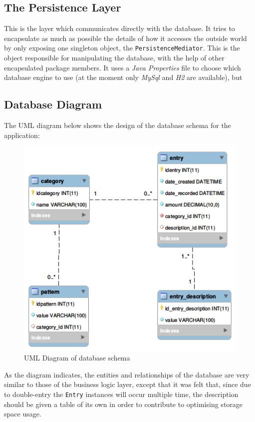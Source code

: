 \subsection{The Persistence Layer} \label{sec:AnalysisAndDesign.PersistenceLayer}
This is the layer which communicates directly with the database. It tries to
encapsulate as much as possible the details of how it accesses the outside
world by only exposing one singleton object, the \texttt{PersistenceMediator}.
This is the object responsible for manipulating the database, with the help of
other encapsulated package members. It uses a \emph{Java Properties} file to
choose which database engine to use (at the moment only \emph{MySql} and
\emph{H2} are available), but 

\subsection{Database Diagram} \label{sec:AnalysisAndDesign.PersistenceLayer}
The UML diagram below shows the design of the database schema for the
application:
\begin{figure}[ht!]
  \begin{center}
    \includegraphics[width=12cm]{./contents/img/Database_Diagram.png}
  \end{center}
  \caption{UML Diagram of database schema}
  \label{fig:ClassDiagram.AllClasses}
\end{figure}
\FloatBarrier

As the diagram indicates, the entities and relationships of the database are
very similar to those of the business logic layer, except that it was felt
that, since due to double-entry the \texttt{Entry} instances will occur
multiple time, the description should be given a table of its own in order to
contribute to optimising storage space usage.

